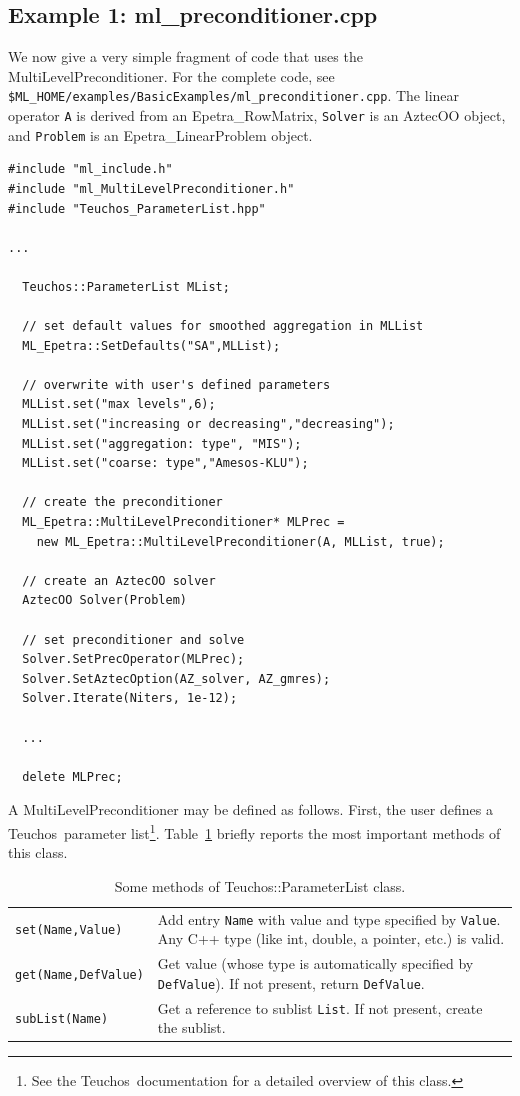 \documentclass{article}[11pt]
\newcommand{\teuchos}  {{\sc Teuchos}}
\begin{document}
\subsection{Example 1: ml\_preconditioner.cpp}
\label{parameter list ex. 1}

We now give a very simple fragment of code that uses the
MultiLevelPreconditioner.
For the complete code, see
\verb!$ML_HOME/examples/BasicExamples/ml_preconditioner.cpp!.
The linear operator \verb!A! is derived from an
Epetra\_RowMatrix, \verb!Solver! is an AztecOO object, and
\verb!Problem! is an Epetra\_LinearProblem object.

\begin{verbatim}
#include "ml_include.h"
#include "ml_MultiLevelPreconditioner.h"
#include "Teuchos_ParameterList.hpp"

...

  Teuchos::ParameterList MList;

  // set default values for smoothed aggregation in MLList
  ML_Epetra::SetDefaults("SA",MLList);

  // overwrite with user's defined parameters
  MLList.set("max levels",6);
  MLList.set("increasing or decreasing","decreasing");
  MLList.set("aggregation: type", "MIS");
  MLList.set("coarse: type","Amesos-KLU");
  
  // create the preconditioner
  ML_Epetra::MultiLevelPreconditioner* MLPrec = 
    new ML_Epetra::MultiLevelPreconditioner(A, MLList, true);

  // create an AztecOO solver
  AztecOO Solver(Problem)

  // set preconditioner and solve
  Solver.SetPrecOperator(MLPrec);
  Solver.SetAztecOption(AZ_solver, AZ_gmres);
  Solver.Iterate(Niters, 1e-12);

  ...

  delete MLPrec;
\end{verbatim}
A MultiLevelPreconditioner may be defined as follows.
First, the user defines a \teuchos~parameter
list\footnote{See the \teuchos~documentation for a detailed overview of
  this class.}.  Table~\ref{tab:teuchos} briefly reports the most
important methods of this class.

\begin{table}[htbp]
  \centering
  \begin{tabular}{| p{4cm} | p{10cm} |}
    \hline
    \verb!set(Name,Value)! & Add entry \verb!Name! with value and type
    specified by \verb!Value!. Any C++ type (like int, double, a
    pointer, etc.) is valid. \\
    \verb!get(Name,DefValue)! & Get value (whose type is automatically
    specified by \verb!DefValue!). If not present, return
    \verb!DefValue!. \\
    \verb!subList(Name)! & Get a reference to sublist \verb!List!. If not
    present, create the sublist. \\
    \hline
  \end{tabular}
  \caption{Some methods of Teuchos::ParameterList class.}
  \label{tab:teuchos}
\end{table}
\end{document}

